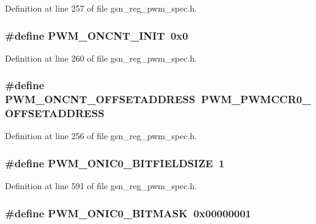 Definition at line 257 of file gsn\_\-reg\_\-pwm\_\-spec.h.

\hypertarget{a00565_a93caaeaab33b499e005ec9df26cafd86}{
\subsubsection[{PWM\_\-ONCNT\_\-INIT}]{\setlength{\rightskip}{0pt plus 5cm}\#define PWM\_\-ONCNT\_\-INIT~0x0}}
\label{a00565_a93caaeaab33b499e005ec9df26cafd86}


Definition at line 260 of file gsn\_\-reg\_\-pwm\_\-spec.h.

\hypertarget{a00565_a81d3568a6a82e43d3ce81c82d7bf9722}{
\subsubsection[{PWM\_\-ONCNT\_\-OFFSETADDRESS}]{\setlength{\rightskip}{0pt plus 5cm}\#define PWM\_\-ONCNT\_\-OFFSETADDRESS~PWM\_\-PWMCCR0\_\-OFFSETADDRESS}}
\label{a00565_a81d3568a6a82e43d3ce81c82d7bf9722}


Definition at line 256 of file gsn\_\-reg\_\-pwm\_\-spec.h.

\hypertarget{a00565_a465874ab844956b4c3fb9a19d9e1acdd}{
\subsubsection[{PWM\_\-ONIC0\_\-BITFIELDSIZE}]{\setlength{\rightskip}{0pt plus 5cm}\#define PWM\_\-ONIC0\_\-BITFIELDSIZE~1}}
\label{a00565_a465874ab844956b4c3fb9a19d9e1acdd}


Definition at line 591 of file gsn\_\-reg\_\-pwm\_\-spec.h.

\hypertarget{a00565_aac0c63571edc91f2d9934facb0b2c0ee}{
\subsubsection[{PWM\_\-ONIC0\_\-BITMASK}]{\setlength{\rightskip}{0pt plus 5cm}\#define PWM\_\-ONIC0\_\-BITMASK~0x00000001}}
\label{a00565_aac0c63571edc91f2d9934facb0b2c0ee}


